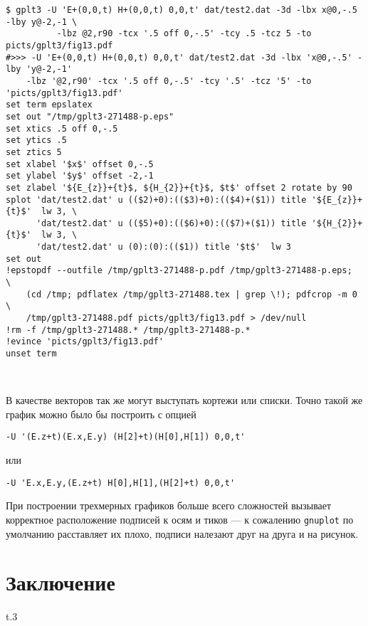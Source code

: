 \documentclass[12pt]{article}
\def\gnuplot{{\tt gnuplot}}
\begin{document}
\vspace{3mm}
\noindent
{\small
\begin{verbatim}
$ gplt3 -U 'E+(0,0,t) H+(0,0,t) 0,0,t' dat/test2.dat -3d -lbx x@0,-.5 -lby y@-2,-1 \
          -lbz @2,r90 -tcx '.5 off 0,-.5' -tcy .5 -tcz 5 -to picts/gplt3/fig13.pdf
#>>> -U 'E+(0,0,t) H+(0,0,t) 0,0,t' dat/test2.dat -3d -lbx 'x@0,-.5' -lby 'y@-2,-1' 
    -lbz '@2,r90' -tcx '.5 off 0,-.5' -tcy '.5' -tcz '5' -to 'picts/gplt3/fig13.pdf'
set term epslatex 
set out "/tmp/gplt3-271488-p.eps"
set xtics .5 off 0,-.5
set ytics .5
set ztics 5
set xlabel '$x$' offset 0,-.5
set ylabel '$y$' offset -2,-1
set zlabel '${E_{z}}+{t}$, ${H_{2}}+{t}$, $t$' offset 2 rotate by 90
splot 'dat/test2.dat' u (($2)+0):(($3)+0):(($4)+($1)) title '${E_{z}}+{t}$'  lw 3, \
      'dat/test2.dat' u (($5)+0):(($6)+0):(($7)+($1)) title '${H_{2}}+{t}$'  lw 3, \
      'dat/test2.dat' u (0):(0):(($1)) title '$t$'  lw 3 
set out
!epstopdf --outfile /tmp/gplt3-271488-p.pdf /tmp/gplt3-271488-p.eps;               \
    (cd /tmp; pdflatex /tmp/gplt3-271488.tex | grep \!); pdfcrop -m 0              \
    /tmp/gplt3-271488.pdf picts/gplt3/fig13.pdf > /dev/null
!rm -f /tmp/gplt3-271488.* /tmp/gplt3-271488-p.*
!evince 'picts/gplt3/fig13.pdf'
unset term
\end{verbatim}
  }
\vspace{-1cm}
\begin{center}
\\[3mm]
\end{center}
В качестве векторов так же могут выступать кортежи или списки. Точно такой же график можно было бы построить с опцией
\begin{verbatim}
-U '(E.z+t)(E.x,E.y) (H[2]+t)(H[0],H[1]) 0,0,t'
\end{verbatim}
или
\begin{verbatim}
-U 'E.x,E.y,(E.z+t) H[0],H[1],(H[2]+t) 0,0,t'
\end{verbatim}
При построении трехмерных графиков больше всего сложностей
вызывает корректное расположение подписей к осям и тиков --- к сожалению \gnuplot{} по умолчанию расставляет их плохо, подписи
налезают друг на друга и на рисунок.

\section{Заключение}
\begin{wrapfigure}[7]{t}{.3\textwidth}
  \vphantom{.}

  \vspace{-2.3cm}
\end{wrapfigure}
\end{document}
